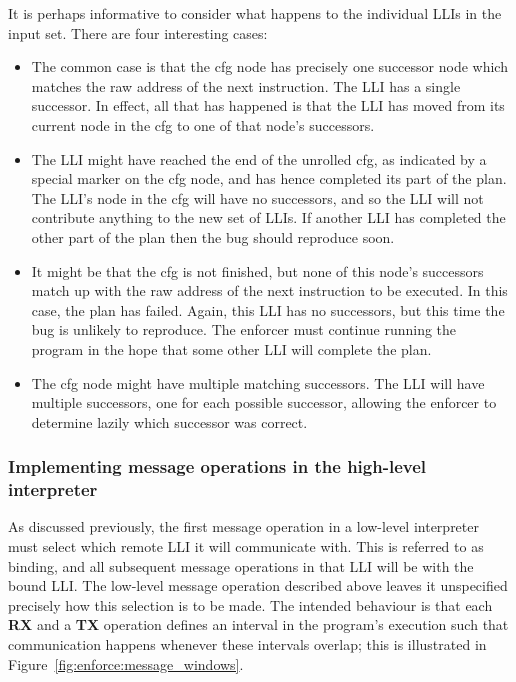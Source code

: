 It is perhaps informative to consider what happens to the individual
LLIs in the input set.  There are four interesting cases:

\begin{itemize}
\item The common case is that the \gls{cfg} node has precisely one successor
  node which matches the raw address of the next instruction.  The LLI
  has a single successor.  In effect, all that has happened is that
  the LLI has moved from its current node in the \gls{cfg} to one of that
  node's successors.

\item The LLI might have reached the end of the unrolled \gls{cfg}, as
  indicated by a special marker on the \gls{cfg} node, and has hence
  completed its part of the plan.  The LLI's node in the \gls{cfg} will have
  no successors, and so the LLI will not contribute anything to the
  new set of LLIs.  If another LLI has completed the other part of the
  plan then the bug should reproduce soon.

\item It might be that the \gls{cfg} is not finished, but none of this
  node's successors match up with the raw address of the next
  instruction to be executed.  In this case, the plan has failed.
  Again, this LLI has no successors, but this time the bug is unlikely
  to reproduce.  The enforcer must continue running the program in the
  hope that some other LLI will complete the plan.

\item The \gls{cfg} node might have multiple matching successors.  The LLI
  will have multiple successors, one for each possible successor,
  allowing the enforcer to determine lazily which successor was
  correct.
\end{itemize}

\subsubsection{Implementing message operations in the high-level interpreter}
\label{sect:enforce:hli_messages}

As discussed previously, the first message operation in a low-level
interpreter must select which remote LLI it will communicate with.
This is referred to as binding, and all subsequent message operations
in that LLI will be with the bound LLI.  The low-level message
operation described above leaves it unspecified precisely how this
selection is to be made.  The intended behaviour is that each \textbf{RX} and a
\textbf{TX} operation defines an interval in the program's execution
such that communication happens whenever these intervals overlap; this
is illustrated in Figure~\ref{fig:enforce:message_windows}.

